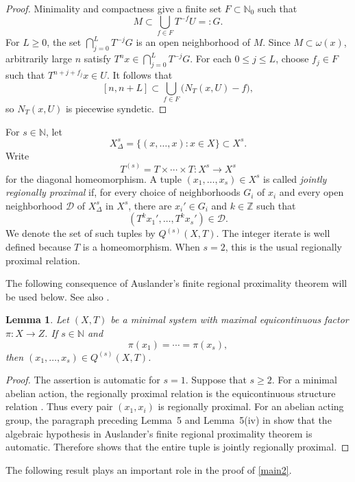 \documentclass[reqno,12pt]{amsart}
\newtheorem{lemma}[thm]{Lemma}
\newcommand{\Nzero}{\mathbb N_0}
\def \N {\mathbb N}
\def \Z {\mathbb Z}
\numberwithin{equation}{section}
\begin{document}
\begin{proof}
Minimality and compactness give a finite set $F\subset\Nzero$ such that
\[
 M\subset \bigcup_{f\in F}T^{-f}U=:G.
\]
For $L\geq0$, the set $\bigcap_{j=0}^{L}T^{-j}G$ is an open neighborhood of
$M$. Since $M\subset\omega(x)$, arbitrarily large $n$ satisfy
$T^nx\in\bigcap_{j=0}^{L}T^{-j}G$. For each $0\leq j\leq L$, choose
$f_j\in F$ such that $T^{n+j+f_j}x\in U$. It follows that
\[
 [n,n+L]\subset\bigcup_{f\in F}\bigl(N_T(x,U)-f\bigr),
\]
so $N_T(x,U)$ is piecewise syndetic.
\end{proof}

For $s\in\N$, let
\[
 X_{\Delta}^s=\{(x,\ldots,x):x\in X\}\subset X^s.
\]
Write
\[
 T^{(s)}=T\times\cdots\times T:X^s\to X^s
\]
for the diagonal homeomorphism.
A tuple $(x_1,\ldots,x_s)\in X^s$ is called \emph{jointly regionally
proximal} if, for every choice of neighborhoods $G_i$ of $x_i$ and every
open neighborhood $\mathcal D$ of $ X_{\Delta}^s$ in $X^s$, there are
$x_i'\in G_i$ and $k\in\Z$ such that
\[
 (T^kx_1',\ldots,T^kx_s')\in\mathcal D.
\]
We denote the set of such tuples by $Q^{(s)}(X,T)$. The integer iterate is
well defined because $T$ is a homeomorphism. When $s=2$, this is the
usual regionally proximal relation.

The following consequence of Auslander's finite regional proximality
theorem will be used below. See also \cite[Corollary 6.9]{HLY}.

\begin{lemma}\label{lem:Auslander-joint}
Let $(X,T)$ be a minimal system with maximal equicontinuous factor
$\pi:X\to Z$. If $s\in\N$ and
\[
 \pi(x_1)=\cdots=\pi(x_s),
\]
then $(x_1,\ldots,x_s)\in Q^{(s)}(X,T)$.
\end{lemma}

\begin{proof}
The assertion is automatic for $s=1$. Suppose that $s\geq2$. For a
minimal abelian action, the regionally proximal relation is the
equicontinuous structure relation
\cite[p.~327]{AuslanderGroup04}. Thus every pair $(x_1,x_i)$ is
regionally proximal. For an abelian acting group, the paragraph preceding
Lemma~5 and Lemma~5(iv) in
\cite[pp.~330--331]{AuslanderGroup04} show that the algebraic hypothesis
in Auslander's finite regional proximality theorem is automatic. Therefore
\cite[Theorem~8, p.~332]{AuslanderGroup04} shows that the entire tuple is
jointly regionally proximal.
\end{proof}

The following result plays an important role in the proof of \cref{main2}.
\end{document}
